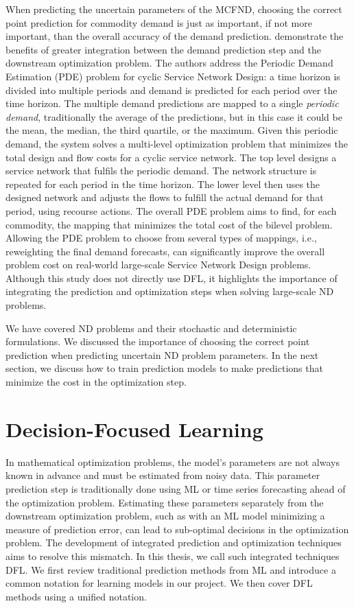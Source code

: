 When predicting the uncertain parameters of the MCFND, choosing the correct point prediction for commodity demand is just as important, if not more important, than the overall accuracy of the demand prediction.
\cite{laagePeriodicFreightDemand2022} demonstrate the benefits of greater integration between the demand prediction step and the downstream optimization problem. 
The authors address the Periodic Demand Estimation (PDE) problem for cyclic Service Network Design: a time horizon is divided into multiple periods and demand is predicted for each period over the time horizon. The multiple demand predictions are mapped to a single \textit{periodic demand}, traditionally the average of the predictions, but in this case it could be the mean, the median, the third quartile, or the maximum. 
Given this periodic demand, the system solves a multi-level optimization problem that minimizes the total design and flow costs for a cyclic service network. 
The top level designs a service network that fulfils the periodic demand. The network structure is repeated for each period in the time horizon. 
The lower level then uses the designed network and adjusts the flows to fulfill the actual demand for that period, using recourse actions. The overall PDE problem aims to find, for each commodity, the mapping that minimizes the total cost of the bilevel problem. 
Allowing the PDE problem to choose from several types of mappings, i.e., reweighting the final demand forecasts, can significantly improve the overall problem cost on real-world large-scale Service Network Design problems. Although this study does not directly use DFL, it highlights the importance of integrating the prediction and optimization steps when solving large-scale ND problems.

We have covered ND problems and their stochastic and deterministic formulations. We discussed the importance of choosing the correct point prediction when predicting uncertain ND problem parameters. In the next section, we discuss how to train prediction models to make predictions that minimize the cost in the optimization step. 

\section{Decision-Focused Learning} \label{sec:litrev:dfl}

In mathematical optimization problems, the model's parameters are not always known in advance and must be estimated from noisy data. This parameter prediction step is traditionally done using ML \citep{bishopPatternRecognitionMachine2006} or time series forecasting \citep{degooijer25YearsTime2006} ahead of the optimization problem. Estimating these parameters separately from the downstream optimization problem, such as with an ML model minimizing a measure of prediction error, can lead to sub-optimal decisions in the optimization problem. The development of integrated prediction and optimization techniques aims to resolve this mismatch. In this thesis, we call such integrated techniques DFL. We first review traditional prediction methods from ML and introduce a common notation for learning models in our project. We then cover DFL methods using a unified notation.

